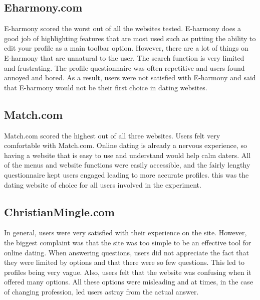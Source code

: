 \documentclass{article}
\begin{document}
\subsection{Eharmony.com}
E-harmony scored the worst out of all the websites tested. E-harmony does a good job of highlighting features that are most used such as putting the ability to edit your profile as a main toolbar option. However, there are a lot of things on E-harmony that are unnatural to the user. The search function is very limited and frustrating. The profile questionnaire was often repetitive and users found annoyed and bored. As a result, users were not satisfied with E-harmony and said that E-harmony would not be their first choice in dating websites.

\subsection{Match.com}
Match.com scored the highest out of all three websites. Users felt very comfortable with Match.com. Online dating is already a nervous experience, so having a website that is easy to use and understand would help calm daters. All of the menus and website functions were easily accessible, and the fairly lengthy questionnaire kept users engaged leading to more accurate profiles. this was the dating website of choice for all users involved in the experiment.

\subsection{ChristianMingle.com}
In general, users were very satisfied with their experience on the site. However, the biggest complaint was that the site was too simple to be an effective tool for online dating. When answering questions, users did not appreciate the fact that they were limited by options and that there were so few questions. This led to profiles being very vague. Also, users felt that the website was confusing when it offered many options. All these options were misleading and at times, in the case of changing profession, led users astray from the actual answer.
\end{document}

